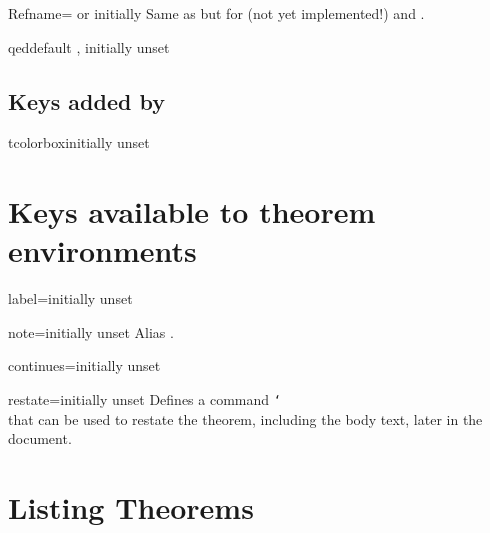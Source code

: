 \documentclass{ltxdoc}
\begin{document}
\begin{docKey}{Refname}{= or }{initially }
Same as  but for  (not yet implemented!) and .
\end{docKey}

\begin{docKey}{qed}{}{default , initially unset}

\end{docKey}

\subsection{Keys added by }

\begin{docKey}{tcolorbox}{}{initially unset}

\end{docKey}

\section{Keys available to theorem environments} \label{in-doc-keys}

\begin{docKey}{label}{=}{initially unset}

\end{docKey}

\begin{docKey}{note}{=}{initially unset}
Alias .
\end{docKey}

\begin{docKey}{continues}{=}{initially unset}

\end{docKey}

\begin{docKey}{restate}{=}{initially unset}
Defines a command \texttt{\char`\\} that can be used to restate the theorem, including the body text, later in the document.
\end{docKey}

\section{Listing Theorems}
\end{document}
